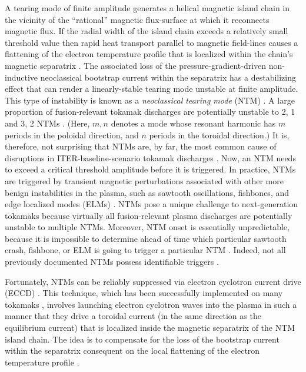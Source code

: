 \documentclass{iopjournal}
\begin{document}
A tearing mode \cite{tear1} of finite amplitude generates a helical magnetic island chain \cite{ntm1} in the vicinity of the ``rational''  magnetic flux-surface \cite{ideal3} at which it reconnects magnetic flux.
If the radial width of the island chain exceeds a relatively small threshold value then rapid  heat transport parallel to magnetic field-lines causes a flattening of the  electron temperature profile
that is localized within the chain's magnetic separatrix \cite{ntm2}. The associated loss of the pressure-gradient-driven non-inductive neoclassical bootstrap current \cite{ntm3} within the separatrix
has a destabilizing effect that can render a linearly-stable tearing mode unstable at finite amplitude. This type of instability is known as a {\em neoclassical tearing mode}\/  (NTM) \cite{tftr,ntm4b,ntm4a,ntm4c}.  A large proportion of fusion-relevant tokamak
discharges are potentially unstable  to 2, 1 and 3, 2 NTMs \cite{ntm4,ntm5}.  (Here, $m, n$ denotes a mode whose resonant harmonic has $m$ periods in the poloidal
direction, and $n$ periods in the toroidal direction.) It is, therefore, not  surprising that NTMs are, by far, the most common cause of disruptions in ITER-baseline-scenario tokamak
discharges \cite{iter,vries,ntm4,ntm5}.
Now, an NTM needs to exceed a critical  threshold amplitude
before it is triggered. In practice, NTMs are
triggered by transient magnetic perturbations associated with other more benign instabilities in the plasma, such as sawtooth oscillations, fishbones, and
edge localized modes (ELMs) \cite{ntm4,ntm5,sawtooth,elm}. NTMs pose a unique challenge to next-generation tokamaks  because  virtually all fusion-relevant plasma discharges 
are potentially unstable to multiple NTMs. Moreover, NTM onset is essentially unpredictable, because it
is impossible to determine ahead of time which particular sawtooth crash, fishbone, or ELM is going to trigger a particular NTM \cite{nstx}. Indeed, not all previously documented NTMs possess identifiable
triggers \cite{ntm6}. 

Fortunately, NTMs can be reliably suppressed via electron cyclotron current drive (ECCD) \cite{zohm,prater}. This technique, which has been
successfully implemented on many tokamaks \cite{eccd1,eccd2,eccd3,eccd3a,eccd3b,eccd4,eccd5}, involves
launching electron cyclotron waves into the plasma in such a manner that they drive a toroidal current (in the same direction as the equilibrium current) that is 
localized  inside the magnetic separatrix of
the NTM island chain. The idea is to compensate for the loss of the bootstrap current within the separatrix consequent on the local flattening
of the electron temperature profile \cite{ntm4,ntm5}.
\end{document}
